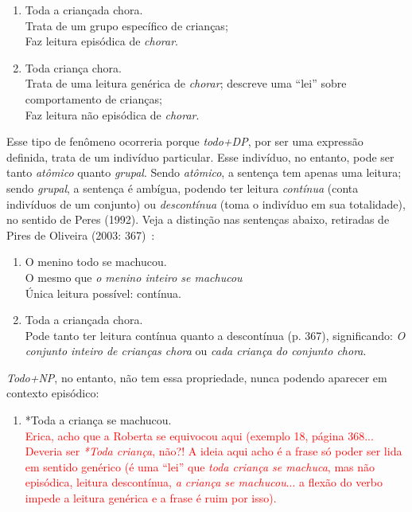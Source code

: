 \begin{enumerate}[resume]
    \item Toda a criançada chora. \\
    Trata de um grupo específico de crianças; \\
    Faz leitura episódica de \emph{chorar}.
    \item Toda criança chora. \\
    Trata de uma leitura genérica de \emph{chorar}; descreve uma ``lei'' sobre comportamento de crianças; \\
    Faz leitura não episódica de \emph{chorar}.
\end{enumerate}

Esse tipo de fenômeno ocorreria porque \emph{todo+DP}, por ser uma expressão definida, trata de um indivíduo particular. Esse indivíduo, no entanto, pode ser tanto \emph{atômico} quanto \emph{grupal}. Sendo \emph{atômico}, a sentença tem apenas uma leitura; sendo \emph{grupal}, a sentença é ambígua, podendo ter leitura \emph{contínua} (conta indivíduos de um conjunto) ou \emph{descontínua} (toma o indivíduo em sua totalidade), no sentido de Peres (1992). Veja a distinção nas sentenças abaixo, retiradas de Pires de Oliveira (2003: 367)~\cite{PiresOliv2003}:

\begin{enumerate}[resume]
    \item O menino todo se machucou. \\
    O mesmo que \emph{o menino inteiro se machucou} \\
    Única leitura possível: contínua.
    \item Toda a criançada chora. \\
    Pode tanto ter leitura contínua quanto a descontínua (p. 367), significando:
    \emph{O conjunto inteiro de crianças chora} ou \emph{cada criança do conjunto chora}.
\end{enumerate}

\emph{Todo+NP}, no entanto, não tem essa propriedade, nunca podendo aparecer em contexto episódico:

\begin{enumerate}[resume]
    \item *Toda a criança se machucou. \\
    \textcolor{red}{Erica, acho que a Roberta se equivocou aqui (exemplo 18, página 368... Deveria ser \emph{*Toda criança}, não?! A ideia aqui acho é a frase só poder ser lida em sentido genérico (é uma ``lei'' que \emph{toda criança se machuca}, mas não episódica, leitura descontínua, \emph{a criança se machucou}... a flexão do verbo impede a leitura genérica e a frase é ruim por isso).}
\end{enumerate}

